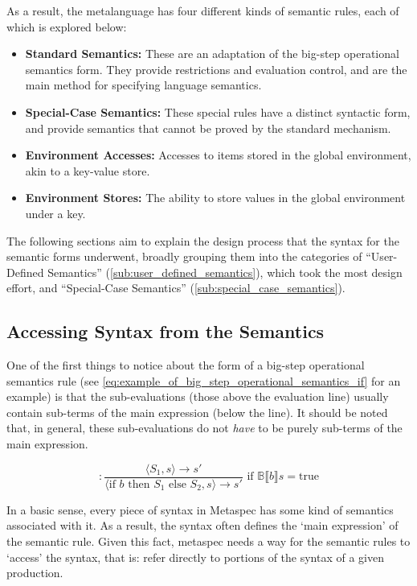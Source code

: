 As a result, the metalanguage has four different kinds of semantic rules, each of which is explored below:
\begin{itemize}
    \item \textbf{Standard Semantics:} These are an adaptation of the big-step operational semantics form.
    They provide restrictions and evaluation control, and are the main method for specifying language semantics.
    \item \textbf{Special-Case Semantics:} These special rules have a distinct syntactic form, and provide semantics that cannot be proved by the standard mechanism.
    \item \textbf{Environment Accesses:} Accesses to items stored in the global environment, akin to a key-value store.
    \item \textbf{Environment Stores:} The ability to store values in the global environment under a key. 
\end{itemize}

The following sections aim to explain the design process that the syntax for the semantic forms underwent, broadly grouping them into the categories of ``User-Defined Semantics'' (\autoref{sub:user_defined_semantics}), which took the most design effort, and ``Special-Case Semantics'' (\autoref{sub:special_case_semantics}).

\subsection{Accessing Syntax from the Semantics} %
\label{sub:accessing_syntax_from_the_semantics}
One of the first things to notice about the form of a big-step operational semantics rule (see \autoref{eq:example_of_big_step_operational_semantics_if} for an example) is that the sub-evaluations (those above the evaluation line) usually contain sub-terms of the main expression (below the line).
It should be noted that, in general, these sub-evaluations do not \textit{have} to be purely sub-terms of the main expression. 

\begin{equation}
    [\text{if}] : \frac{\langle S_1, s \rangle \to s'}{\langle \text{if } b \text{ then } S_1 \text{ else } S_2, s\rangle \to s'} \text{ if } \mathbb{B}\llbracket b \rrbracket s = \text{true}
    \label{eq:example_of_big_step_operational_semantics_if}
\end{equation}

In a basic sense, every piece of syntax in Metaspec has some kind of semantics associated with it.
As a result, the syntax often defines the `main expression' of the semantic rule.
Given this fact, \gls{metaspec} needs a way for the semantic rules to `access' the syntax, that is: refer directly to portions of the syntax of a given production. \\

